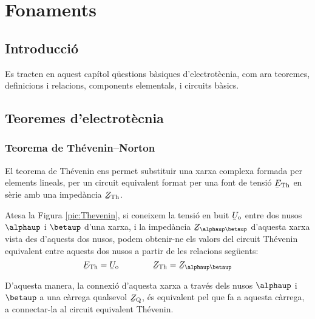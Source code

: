 \chapter{Fonaments}

\section{Introducció}
Es tracten en aquest capítol qüestions bàsiques
d'electrotècnia, com ara teoremes, definicions i relacions, components elementals, i circuits bàsics.


\section{Teoremes d'electrotècnia}\label{sec:teoremes}

\subsection{\texorpdfstring{Teorema de Thévenin--Norton}{Teorema de
            Thévenin-Norton}}\label{sec:T_N}

El teorema de Thévenin ens permet
substituir una xarxa complexa formada per elements lineals, per un
circuit equivalent format per una font de tensió $\cmplx{E}\ped{Th}$
en sèrie amb una impedància $\cmplx{Z}\ped{Th}$.


Atesa la Figura \vref{pic:Thevenin}, si coneixem la tensió en
buit $\cmplx{U}\ped{o}$ entre dos nusos $\alphaup$ i $\betaup$ d'una
xarxa, i la impedància $\cmplx{Z}_{\alphaup\betaup}$ d'aquesta xarxa
vista des d'aquests dos nusos, podem obtenir-ne els valors del circuit
Thévenin equivalent entre aquests dos nusos a partir de les
relacions següents:
\begin{equation}
   \cmplx{E}\ped{Th} = \cmplx{U}\ped{o} \qquad\qquad  \cmplx{Z}\ped{Th} = \cmplx{Z}_{\alphaup\betaup}
\end{equation}

D'aquesta manera, la connexió d'aquesta xarxa a través dels nusos
$\alphaup$ i $\betaup$ a una càrrega qualsevol $\cmplx{Z}\ped{Q}$, és
equivalent pel que fa a aquesta càrrega, a connectar-la al circuit
equivalent Thévenin.
\begin{center}
    
    \label{pic:Thevenin}
\end{center}

